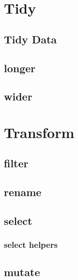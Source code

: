 \documentclass[
  12pt,
]{book}
\begin{document}
\hypertarget{tidy-1}{%
\chapter{Tidy}\label{tidy-1}}

\hypertarget{tidy-data}{%
\section{Tidy Data}\label{tidy-data}}

\hypertarget{longer}{%
\section{longer}\label{longer}}

\hypertarget{wider}{%
\section{wider}\label{wider}}

\hypertarget{transform-1}{%
\chapter{Transform}\label{transform-1}}

\hypertarget{filter}{%
\section{filter}\label{filter}}

\hypertarget{rename}{%
\section{rename}\label{rename}}

\hypertarget{select}{%
\section{select}\label{select}}

\hypertarget{select-helpers}{%
\subsection{select helpers}\label{select-helpers}}

\hypertarget{mutate}{%
\section{mutate}\label{mutate}}
\end{document}

